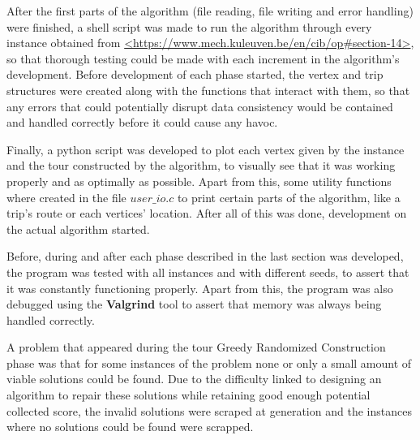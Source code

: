 After the first parts of the algorithm (file reading, file writing and error handling) were finished, a shell script was made to run the algorithm through every instance obtained from
\url{<https://www.mech.kuleuven.be/en/cib/op#section-14>}, so that thorough testing could be made with each increment in the algorithm's development. Before development of each phase started, the vertex and trip structures were created along with the functions that interact with them, so that any errors that could potentially disrupt data consistency would be contained and handled correctly before it could cause any havoc.

Finally, a python script was developed to plot each vertex given by the instance and the tour constructed by the algorithm, to visually see that it was working properly and as optimally as possible. Apart from this, some utility functions where created in the file $user\_io.c$ to print certain parts of the algorithm, like a trip's route or each vertices' location. After all of this was done, development on the actual algorithm started.

Before, during and after each phase described in the last section was developed, the program was tested with all instances and with different seeds, to assert that it was constantly functioning properly. Apart from this, the program was also debugged using the \textbf{Valgrind} tool to assert that memory was always being handled correctly.

A problem that appeared during the tour Greedy Randomized Construction phase was that for some instances of the problem none or only a small amount of viable solutions could be found. Due to the difficulty linked to designing an algorithm to repair these solutions while retaining good enough potential collected score, the invalid solutions were scraped at generation and the instances where no solutions could be found were scrapped.

